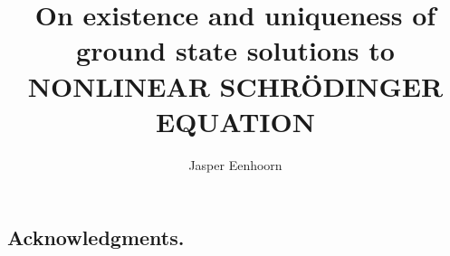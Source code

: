 \documentclass[11pt,a4paper]{amsart}
\title[]{On existence and uniqueness of ground state solutions to NONLINEAR SCHR\"ODINGER EQUATION}
\author[]{Jasper Eenhoorn}
\date{}
\theoremstyle{definition}
\numberwithin{equation}{section}
\newcommand{\comm}[1]{}
\begin{document}















	

\subsection*{Acknowledgments.}  
\comm{The authors are grateful to Gregory Berkolaiko, Pavel Exner and Delio Mugnolo for useful discussions. 
D.F. and D.N.  acknowledge the support of FIRB 2012 project ``Dispersive dynamics: Fourier Analysis and Variational Methods'', Ministry of University and
Research of Italian Republic  (code RBFR12MXPO).
C.C. acknowledges the support of the FIR 2013 project ``Condensed Matter in Mathematical Physics'', Ministry of University and
Research of Italian Republic  (code RBFR13WAET)}
\end{document}
